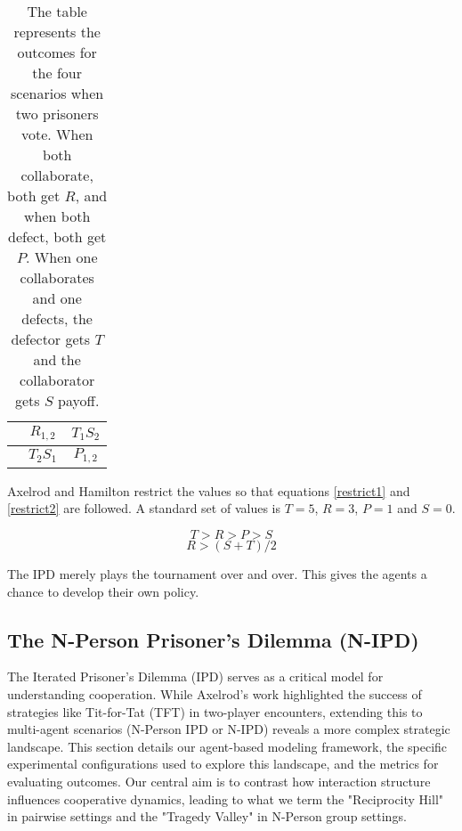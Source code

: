 \documentclass[]{llncs} %
\begin{document}
\begin {table} [ht]
\begin{center}
\begin {tabular}{c | c | c |}
\hline
& $R_{1,2}$ &  $T_1 S_2$ \\
\hline
& $T_2 S_1$ &  $P_{1,2}$ \\
\hline
\end {tabular}
\caption {The table represents the outcomes for the four scenarios when
  two prisoners vote.  When both collaborate, both get $R$, and when
  both defect, both get $P$.  When one collaborates and one defects,
  the defector gets $T$ and the collaborator gets $S$ payoff.}
\label {tabPayoff}
\end {center}
\end {table}

Axelrod and Hamilton restrict the values so that equations \ref {restrict1}
and \ref {restrict2} are followed.  A standard set of values is $T=5$, $R=3$,
$P=1$ and $S=0$.

\begin{equation}\label{restrict1}
T > R > P > S 
\end{equation}
\begin{equation}\label{restrict2}
R > (S + T) / 2
\end{equation}

The IPD merely plays the tournament over and over.  This gives the agents
a chance to develop their own policy.  


\subsection{The N-Person Prisoner's Dilemma (N-IPD)}

The Iterated Prisoner's Dilemma (IPD) serves as a critical model for understanding cooperation. While Axelrod's work highlighted the success of strategies like Tit-for-Tat (TFT) in two-player encounters, extending this to multi-agent scenarios (N-Person IPD or N-IPD) reveals a more complex strategic landscape. This section details our agent-based modeling framework, the specific experimental configurations used to explore this landscape, and the metrics for evaluating outcomes. Our central aim is to contrast how interaction structure influences cooperative dynamics, leading to what we term the "Reciprocity Hill" in pairwise settings and the "Tragedy Valley" in N-Person group settings.
\end{document}
